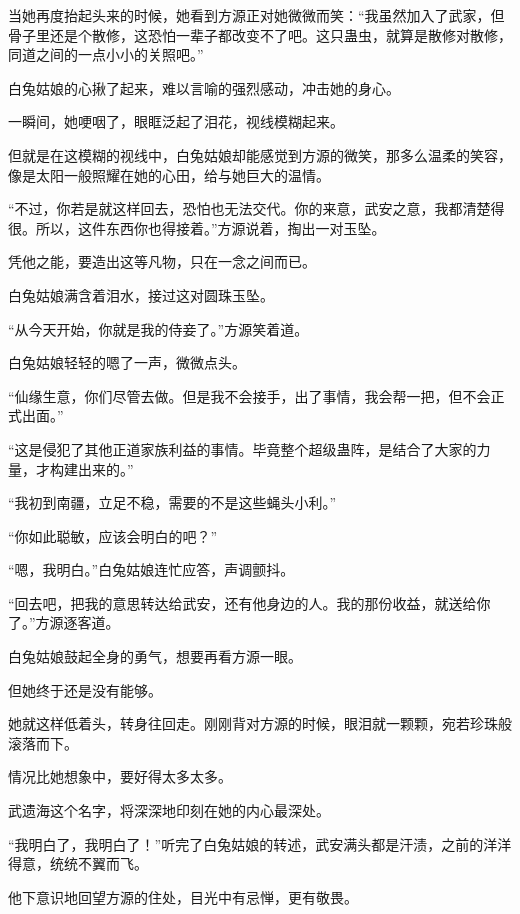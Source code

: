 \begin{this_body}
当她再度抬起头来的时候，她看到方源正对她微微而笑：“我虽然加入了武家，但骨子里还是个散修，这恐怕一辈子都改变不了吧。这只蛊虫，就算是散修对散修，同道之间的一点小小的关照吧。”

白兔姑娘的心揪了起来，难以言喻的强烈感动，冲击她的身心。

一瞬间，她哽咽了，眼眶泛起了泪花，视线模糊起来。

但就是在这模糊的视线中，白兔姑娘却能感觉到方源的微笑，那多么温柔的笑容，像是太阳一般照耀在她的心田，给与她巨大的温情。

“不过，你若是就这样回去，恐怕也无法交代。你的来意，武安之意，我都清楚得很。所以，这件东西你也得接着。”方源说着，掏出一对玉坠。

凭他之能，要造出这等凡物，只在一念之间而已。

白兔姑娘满含着泪水，接过这对圆珠玉坠。

“从今天开始，你就是我的侍妾了。”方源笑着道。

白兔姑娘轻轻的嗯了一声，微微点头。

“仙缘生意，你们尽管去做。但是我不会接手，出了事情，我会帮一把，但不会正式出面。”

“这是侵犯了其他正道家族利益的事情。毕竟整个超级蛊阵，是结合了大家的力量，才构建出来的。”

“我初到南疆，立足不稳，需要的不是这些蝇头小利。”

“你如此聪敏，应该会明白的吧？”

“嗯，我明白。”白兔姑娘连忙应答，声调颤抖。

“回去吧，把我的意思转达给武安，还有他身边的人。我的那份收益，就送给你了。”方源逐客道。

白兔姑娘鼓起全身的勇气，想要再看方源一眼。

但她终于还是没有能够。

她就这样低着头，转身往回走。刚刚背对方源的时候，眼泪就一颗颗，宛若珍珠般滚落而下。

情况比她想象中，要好得太多太多。

武遗海这个名字，将深深地印刻在她的内心最深处。

“我明白了，我明白了！”听完了白兔姑娘的转述，武安满头都是汗渍，之前的洋洋得意，统统不翼而飞。

他下意识地回望方源的住处，目光中有忌惮，更有敬畏。

\end{this_body}

